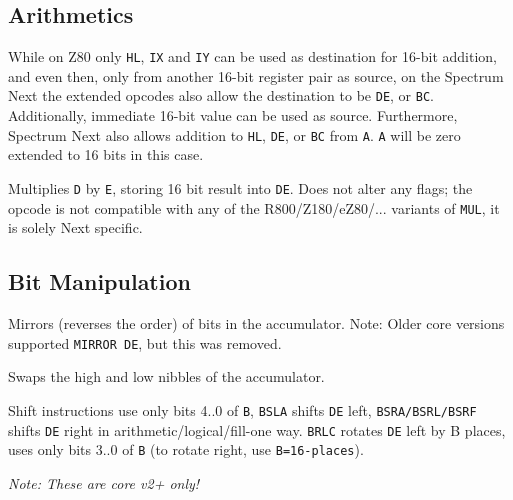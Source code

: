 \documentclass[twoside,openright,a4paper]{book}
\begin{document}
\subsection{Arithmetics}

\begin{basedescript}{
	\desclabelstyle{\multilinelabel}
	\desclabelwidth{3cm}}


	While on Z80 only {\tt HL}, {\tt IX} and {\tt IY} can be used as destination for 16-bit addition, and even then, only from another 16-bit register pair as source, on the Spectrum Next the extended opcodes also allow the destination to be {\tt DE}, or {\tt BC}. Additionally, immediate 16-bit value can be used as source. Furthermore, Spectrum Next also allows addition to {\tt HL}, {\tt DE}, or {\tt BC} from {\tt A}. {\tt A} will be zero extended to 16 bits in this case.

	
	Multiplies {\tt D} by {\tt E}, storing 16 bit result into {\tt DE}. Does not alter any flags; the opcode is not compatible with any of the R800/Z180/eZ80/... variants of {\tt MUL}, it is solely Next specific.

\end{basedescript}

\subsection{Bit Manipulation}

\begin{basedescript}{
	\desclabelstyle{\multilinelabel}
	\desclabelwidth{3cm}}

	
	Mirrors (reverses the order) of bits in the accumulator. Note: Older core versions supported {\tt MIRROR DE}, but this was removed.


	Swaps the high and low nibbles of the accumulator.

	
	Shift instructions use only bits 4..0 of {\tt B}, {\tt BSLA} shifts {\tt DE} left, {\tt BSRA/BSRL/BSRF} shifts {\tt DE} right in arithmetic/logical/fill-one way. {\tt BRLC} rotates {\tt DE} left by B places, uses only bits 3..0 of {\tt B} (to rotate right, use {\tt B=16-places}).

	\emph{Note: These are core v2+ only!}

\end{basedescript}
	
\end{document}
